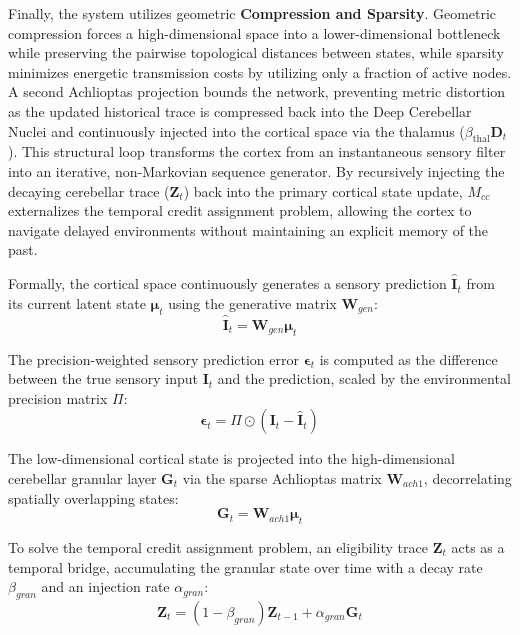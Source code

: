 \documentclass[12pt, a4paper]{extarticle}
\begin{document}
Finally, the system utilizes geometric \textbf{Compression and Sparsity}. Geometric compression forces a high-dimensional space into a lower-dimensional bottleneck while preserving the pairwise topological distances between states, while sparsity minimizes energetic transmission costs by utilizing only a fraction of active nodes. A second Achlioptas projection bounds the network, preventing metric distortion as the updated historical trace is compressed back into the Deep Cerebellar Nuclei and continuously injected into the cortical space via the thalamus ($\beta_{\mathrm{thal}} \mathbf{D}_t$). This structural loop transforms the cortex from an instantaneous sensory filter into an iterative, non-Markovian sequence generator. By recursively injecting the decaying cerebellar trace ($\mathbf{Z}_t$) back into the primary cortical state update, $M_{cc}$ externalizes the temporal credit assignment problem, allowing the cortex to navigate delayed environments without maintaining an explicit memory of the past.

Formally, the cortical space continuously generates a sensory prediction $\hat{\mathbf{I}}_t$ from its current latent state $\boldsymbol{\mu}_{t}$ using the generative matrix $\mathbf{W}_{gen}$:
\begin{equation}
	\hat{\mathbf{I}}_t = \mathbf{W}_{gen} \boldsymbol{\mu}_{t}\label{ctx_hallucination}
\end{equation}

The precision-weighted sensory prediction error $\boldsymbol{\epsilon}_{t}$ is computed as the difference between the true sensory input $\mathbf{I}_{t}$ and the prediction, scaled by the environmental precision matrix $\Pi$:
\begin{equation}
	\boldsymbol{\epsilon}_{t} = \Pi \odot (\mathbf{I}_{t} - \hat{\mathbf{I}}_{t})\label{ctx_pe}
\end{equation}

The low-dimensional cortical state is projected into the high-dimensional cerebellar granular layer $\mathbf{G}_{t}$ via the sparse Achlioptas matrix $\mathbf{W}_{ach1}$, decorrelating spatially overlapping states:
\begin{equation}
	\mathbf{G}_{t} = \mathbf{W}_{ach1} \boldsymbol{\mu}_{t}\label{gran}
\end{equation}

To solve the temporal credit assignment problem, an eligibility trace $\mathbf{Z}_{t}$ acts as a temporal bridge, accumulating the granular state over time with a decay rate $\beta_{gran}$ and an injection rate $\alpha_{gran}$:
\begin{equation}
	\mathbf{Z}_{t} = (1 - \beta_{gran}) \mathbf{Z}_{t-1} + \alpha_{gran} \mathbf{G}_{t}\label{et}
\end{equation}
\end{document}
